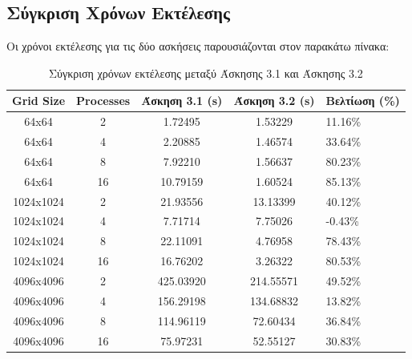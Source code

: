 \documentclass{article}
\begin{document}
\subsection*{Σύγκριση Χρόνων Εκτέλεσης}
Οι χρόνοι εκτέλεσης για τις δύο ασκήσεις παρουσιάζονται στον παρακάτω πίνακα:
\begin{table}[h]
    \centering
    \begin{tabularx}{\textwidth}{|c|c|c|c|X|}
        \hline 
        \textbf{Grid Size} & \textbf{Processes} & \textbf{Άσκηση 3.1 (s)} & \textbf{Άσκηση 3.2 (s)} & \textbf{Βελτίωση (\%)} \\
        \hline
        64x64 & 2 & 1.72495 & 1.53229 & 11.16\% \\
        \hline
        64x64 & 4 & 2.20885 & 1.46574 & 33.64\% \\
        \hline
        64x64 & 8 & 7.92210 & 1.56637 & 80.23\% \\
        \hline
        64x64 & 16 & 10.79159 & 1.60524 & 85.13\% \\
        \hline
        1024x1024 & 2 & 21.93556 & 13.13399 & 40.12\% \\
        \hline
        1024x1024 & 4 & 7.71714 & 7.75026 & -0.43\% \\
        \hline
        1024x1024 & 8 & 22.11091 & 4.76958 & 78.43\% \\
        \hline
        1024x1024 & 16 & 16.76202 & 3.26322 & 80.53\% \\
        \hline
        4096x4096 & 2 & 425.03920 & 214.55571 & 49.52\% \\
        \hline
        4096x4096 & 4 & 156.29198 & 134.68832 & 13.82\% \\
        \hline
        4096x4096 & 8 & 114.96119 & 72.60434 & 36.84\% \\
        \hline
        4096x4096 & 16 & 75.97231 & 52.55127 & 30.83\% \\
        \hline
    \end{tabularx}
    \caption{Σύγκριση χρόνων εκτέλεσης μεταξύ Άσκησης 3.1 και Άσκησης 3.2}
\end{table}
\end{document}
